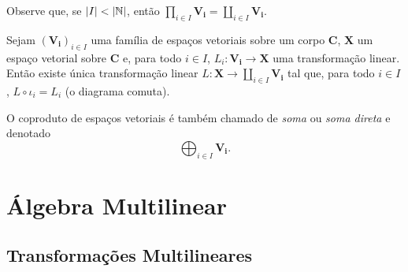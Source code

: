 Observe que, se $\left\vert{I}\right\vert < \left\vert{\mathbb{N}}\right\vert$, então $\prod_{i \in I} \bm{V_i} = \coprod_{i \in I} \bm{V_i}$.

\begin{prop}
Sejam $(\bm{V_i})_{i \in I}$ uma família de espaços vetoriais sobre um corpo $\bm C$, $\bm X$ um espaço vetorial sobre $\bm C$ e, para todo $i \in I$, $L_i: \bm{V_i} \to \bm X$ uma transformação linear. Então existe única transformação linear $L: \bm X \to \coprod_{i \in I} \bm{V_i}$ tal que, para todo $i \in I$, $L \circ \iota_i = L_i$ (o diagrama comuta).
\begin{figure}
\centering
{}
\end{figure}
\end{prop}

O coproduto de espaços vetoriais é também chamado de \emph{soma} ou \emph{soma direta} e denotado
	\begin{equation*}
	\bigoplus_{i \in I} \bm{V_i}.
	\end{equation*}


























\chapter{Álgebra Multilinear}

\section{Transformações Multilineares}


